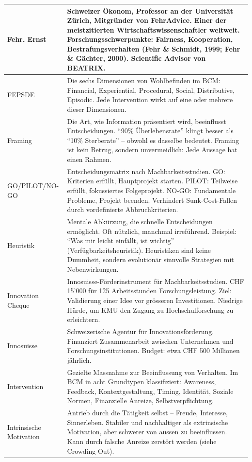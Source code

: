\documentclass[11pt,a4paper]{article}
\begin{document}
\begin{longtable}{@{}L{4cm}L{10cm}@{}}
Fehr, Ernst & Schweizer Ökonom, Professor an der Universität Zürich, Mitgründer von FehrAdvice. Einer der meistzitierten Wirtschaftswissenschaftler weltweit. Forschungsschwerpunkte: Fairness, Kooperation, Bestrafungsverhalten (Fehr \& Schmidt, 1999; Fehr \& Gächter, 2000). Scientific Advisor von BEATRIX. \\
\midrule
FEPSDE & Die sechs Dimensionen von Wohlbefinden im BCM: Financial, Experiential, Procedural, Social, Distributive, Episodic. Jede Intervention wirkt auf eine oder mehrere dieser Dimensionen. \\
\midrule
Framing & Die Art, wie Information präsentiert wird, beeinflusst Entscheidungen. ``90\% Überlebensrate'' klingt besser als ``10\% Sterberate'' -- obwohl es dasselbe bedeutet. Framing ist kein Betrug, sondern unvermeidlich: Jede Aussage hat einen Rahmen. \\
\midrule
GO/PILOT/NO-GO & Entscheidungsmatrix nach Machbarkeitsstudien. GO: Kriterien erfüllt, Hauptprojekt starten. PILOT: Teilweise erfüllt, fokussiertes Folgeprojekt. NO-GO: Fundamentale Probleme, Projekt beenden. Verhindert Sunk-Cost-Fallen durch vordefinierte Abbruchkriterien. \\
\midrule
Heuristik & Mentale Abkürzung, die schnelle Entscheidungen ermöglicht. Oft nützlich, manchmal irreführend. Beispiel: ``Was mir leicht einfällt, ist wichtig'' (Verfügbarkeitsheuristik). Heuristiken sind keine Dummheit, sondern evolutionär sinnvolle Strategien mit Nebenwirkungen. \\
\midrule
Innovation Cheque & Innosuisse-Förderinstrument für Machbarkeitsstudien. CHF 15'000 für 125 Arbeitsstunden Forschungsleistung. Ziel: Validierung einer Idee vor grösseren Investitionen. Niedrige Hürde, um KMU den Zugang zu Hochschulforschung zu erleichtern. \\
\midrule
Innosuisse & Schweizerische Agentur für Innovationsförderung. Finanziert Zusammenarbeit zwischen Unternehmen und Forschungsinstitutionen. Budget: etwa CHF 500 Millionen jährlich. \\
\midrule
Intervention & Gezielte Massnahme zur Beeinflussung von Verhalten. Im BCM in acht Grundtypen klassifiziert: Awareness, Feedback, Kontextgestaltung, Timing, Identität, Soziale Normen, Finanzielle Anreize, Selbstverpflichtung. \\
\midrule
Intrinsische Motivation & Antrieb durch die Tätigkeit selbst -- Freude, Interesse, Sinnerleben. Stabiler und nachhaltiger als extrinsische Motivation, aber schwerer von aussen zu beeinflussen. Kann durch falsche Anreize zerstört werden (siehe Crowding-Out). \\

\end{longtable}
\end{document}
